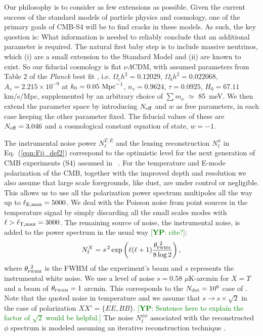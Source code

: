 \documentclass[aps,prd,reprint,superscriptaddress]{revtex4-1}
\newcommand{\yp}[1]{\textcolor{green}{[{\bf YP}: #1]}}
\newcommand\refeq[1]{Eq.~(\ref{eqn:#1})}
\begin{document}
Our philosophy is to consider as few extensions as possible. Given the current success of the standard models of particle physics and cosmology, one of the primary goals of CMB-S4 will be to find cracks in these models. As such, the key question is: What information is needed to reliably conclude that an additional parameter is required. The natural first baby step is to include massive neutrinos, which (i) are a small extension to the Standard Model and (ii) are known to exist. So our fiducial cosmology is flat $\nu \Lambda$CDM, with assumed 
parameters from Table 2 of the \textit{Planck} best fit \cite{planck-collaboration:2014g}, i.e. $\Omega_c h^2 = 0.12029$, $\Omega_b h^2 = 0.022068$, $A_s = 2.215\times10^{-9}$ at $k_0 = 0.05\ {\rm Mpc}^{-1}$, $n_s = 0.9624$, $\tau = 0.0925$, $H_0 = 67.11$ km/s/Mpc, supplemented by an arbitrary choice of $\sum m_\nu$ $\simeq$ 85\ meV.  
We then extend the parameter space by introducing $N_{\rm eff}$ and $w$ as free parameters, in each case keeping the other parameter fixed.
The fiducial values of these are $N_{\rm eff}=3.046$ and a cosmological constant equation of state, $w=-1$.

The instrumental noise power $N_{\ell}^{T,E}$ and the lensing reconstruction $N_{\ell}^{\phi}$ in \refeq{Fij_def2} correspond to the optimistic level for the next generation of CMB experiments (S4) assumed in ~\cite{2013arXiv1309.5383A,wu:2014,2013PhRvD..87h3008H}.
For the temperature and E-mode polarization of the CMB, together with the improved depth and resolution we also assume that large scale foregrounds, like dust, are under control or negligible. This allows us to use all the polarization power spectrum multipoles all the way up to $\ell_{\rm E,max}=5000$. We deal with the Poisson noise from point sources in the temperature signal by simply discarding all the small scales modes with $\ell>\ell_{\rm T,max}=3000$.
The remaining source of noise, the instrumental noise, is added to the power spectrum in the usual way \yp{cite?}:
 \begin{equation}
 	\centering
		N^{X}_\ell = s^{\, 2} \exp \left(\ell(\ell+1) \frac{\theta^{\ 2}_{\textsc{fwhm}}}{8\log2}\right),
	\label{eq:beamnoise}
\end{equation}
where $\theta^{\ 2}_{\textsc{fwhm}}$ is the FWHM of the experiment's beam and $s$ represents the instrumental white noise.
We use a level of noise $s = 0.58$ $\mu$K-arcmin for $X=T$ and a beam of $\theta_{\textsc{fwhm}}=1$ arcmin. This corresponds to the $N_{\rm det}=10^{6}$ case of \cite{wu:2014}. 
Note that the quoted noise in temperature and we assume that $s \rightarrow s\times \sqrt{2}$ in the case of polarization $ XX' = \{ EE, BB \}$. \yp{Sentence here to explain the factor of $\sqrt{2}$ would be helpful.}
The noise $N_\ell^{\phi\phi}$ associated with the reconstructed $\phi$ spectrum is modeled assuming an iterative reconstruction technique \cite{seljak:2004}. 
\end{document}
